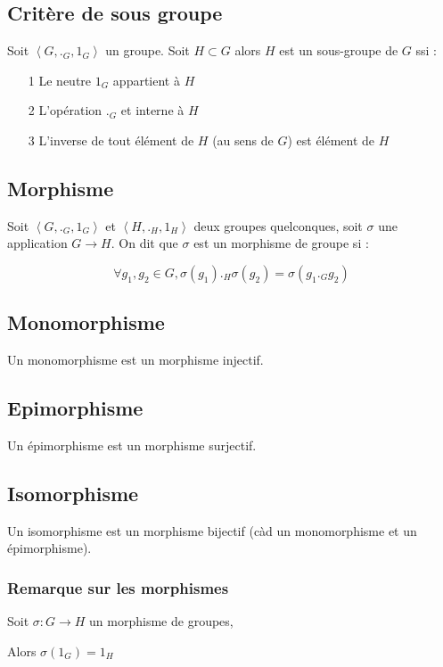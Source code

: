 \documentclass[a4paper,10pt]{article}
\newcommand{\grp}[1]{\left\langle #1 \right\rangle}
\newcommand{\ap}{\rightarrow}
\begin{document}
\subsection{Critère de sous groupe}
Soit $\grp{G,._G,1_G}$ un groupe. Soit $H \subset G$ alors $H$ est un sous-groupe de $G$ ssi :

\begin{itemize}
 \item[1]{Le neutre $1_G$ appartient à $H$}
 \item[2]{L'opération $._G$ et interne à $H$}
 \item[3]{L'inverse de tout élément de $H$ (au sens de $G$) est élément de $H$}
\end{itemize}

\subsection{Morphisme}

Soit $\grp{G,._G,1_G}$ et $\grp{H,._H,1_H}$ deux groupes quelconques, soit $\sigma$ une application $G \ap H$. On dit que $\sigma$ est un morphisme de groupe si :

$$\forall g_1, g_2 \in G, \sigma(g_1) ._H \sigma(g_2) = \sigma(g_1 ._G g_2)$$

\subsection{Monomorphisme}

Un monomorphisme est un morphisme injectif.

\subsection{Epimorphisme}

Un épimorphisme est un morphisme surjectif.

\subsection{Isomorphisme}

Un isomorphisme est un morphisme bijectif (càd un monomorphisme et un épimorphisme).

\subsubsection{Remarque sur les morphismes}
Soit $\sigma : G \ap H$ un morphisme de groupes,

Alors $\sigma (1_G) = 1_H$
\end{document}
